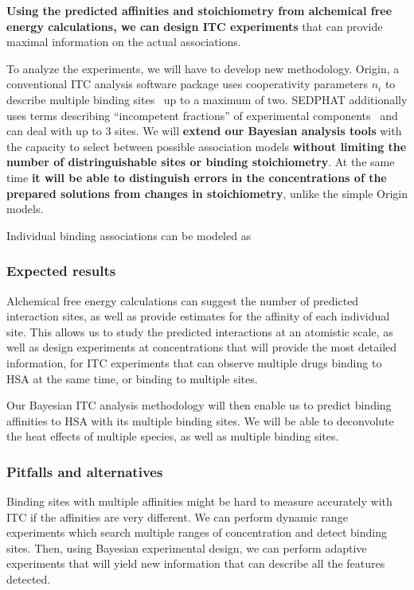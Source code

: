 \documentclass[10pt,final]{article}
\begin{document}
\textbf{Using the predicted affinities and stoichiometry from alchemical free energy calculations, we can design ITC experiments} that can provide maximal information on the actual associations. 

To analyze the experiments, we will have to develop new methodology. 
Origin, a conventional ITC analysis software package uses cooperativity parameters $n_i$ to describe multiple binding sites~\cite{MicroCal2004a} up to a maximum of two. SEDPHAT additionally uses terms describing ``incompetent fractions'' of experimental components~\cite{Houtman2007a,Zhao2015b} and can deal with up to 3 sites.
We will \textbf{extend our Bayesian analysis tools} with the capacity to select between possible association models \textbf{without limiting the number of distringuishable sites or binding stoichiometry}. At the same time \textbf{it will be able to distinguish errors in the concentrations of the prepared solutions from changes in stoichiometry}, unlike the simple Origin models. 


Individual binding associations can be modeled as

\subsubsection*{Expected results}
Alchemical free energy calculations can suggest the number of predicted interaction sites, as well as provide estimates for the affinity of each individual site.
This allows us to study the predicted interactions at an atomistic scale, as well as design experiments at concentrations that will provide the most detailed information, for ITC experiments that can observe multiple drugs binding to HSA at the same time, or binding to multiple sites.


Our Bayesian ITC analysis methodology will then enable us to predict binding affinities to HSA with its multiple binding sites. We will be able to deconvolute the heat effects of multiple species, as well as multiple binding sites.

\subsubsection*{Pitfalls and alternatives}
Binding sites with multiple affinities might be hard to measure accurately with ITC if the affinities are very different. We can perform dynamic range experiments which search multiple ranges of concentration and detect binding sites. Then, using Bayesian experimental design, we can perform adaptive experiments that will yield new information that can describe all the features detected.
\end{document}

